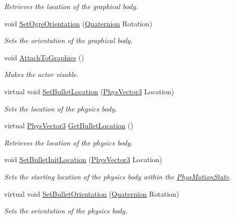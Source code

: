 \begin{DoxyCompactItemize}
\begin{DoxyCompactList}\small\item\em Retrieves the location of the graphical body. \item\end{DoxyCompactList}\item 
void \hyperlink{classActorBase_ad13a4ba6d349dfab4965e58b8335d519}{SetOgreOrientation} (\hyperlink{classphys_1_1Quaternion}{Quaternion} Rotation)
\begin{DoxyCompactList}\small\item\em Sets the orientation of the graphical body. \item\end{DoxyCompactList}\item 
void \hyperlink{classActorBase_afab604970fede16ccde0c6b8e72d9ee0}{AttachToGraphics} ()
\begin{DoxyCompactList}\small\item\em Makes the actor visable. \item\end{DoxyCompactList}\item 
virtual void \hyperlink{classActorBase_af64a57138bbd32c52581a5c8d0d29a76}{SetBulletLocation} (\hyperlink{classPhysVector3}{PhysVector3} Location)
\begin{DoxyCompactList}\small\item\em Sets the location of the physics body. \item\end{DoxyCompactList}\item 
virtual \hyperlink{classPhysVector3}{PhysVector3} \hyperlink{classActorBase_ae84ff822d2f962360bf291bb2c88eb3e}{GetBulletLocation} ()
\begin{DoxyCompactList}\small\item\em Retrieves the location of the physics body. \item\end{DoxyCompactList}\item 
void \hyperlink{classActorBase_af52177760d530df2b0987ed8626a656d}{SetBulletInitLocation} (\hyperlink{classPhysVector3}{PhysVector3} Location)
\begin{DoxyCompactList}\small\item\em Sets the starting location of the physics body within the \hyperlink{classPhysMotionState}{PhysMotionState}. \item\end{DoxyCompactList}\item 
virtual void \hyperlink{classActorBase_a1d9a2b13dcff7a6a2dc83f08f1db97ce}{SetBulletOrientation} (\hyperlink{classphys_1_1Quaternion}{Quaternion} Rotation)
\begin{DoxyCompactList}\small\item\em Sets the orientation of the physics body. \item\end{DoxyCompactList}\end{DoxyCompactItemize}
